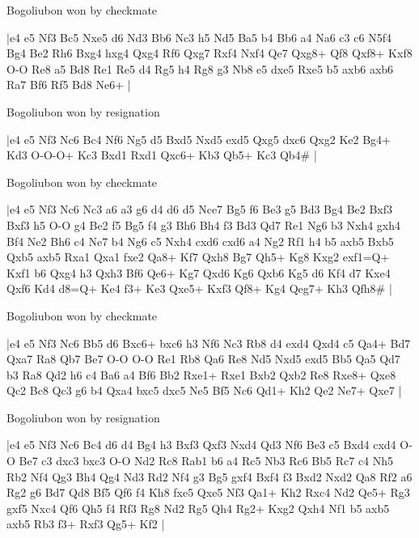 \showboard

Bogoliubon won by checkmate

\makegametitle
|e4 e5 Nf3 Bc5 Nxe5 d6 Nd3 Bb6 Nc3 h5 Nd5 Ba5 b4 Bb6 a4 Na6 c3 c6 N5f4 Bg4 Be2 Rh6 Bxg4 hxg4 Qxg4 Rf6 Qxg7 Rxf4 Nxf4 Qe7 Qxg8+ Qf8 Qxf8+ Kxf8 O-O Re8 a5 Bd8 Re1 Re5 d4 Rg5 h4 Rg8 g3 Nb8 e5 dxe5 Rxe5 b5 axb6 axb6 Ra7 Bf6 Rf5 Bd8 Ne6+  |

\showboard

Bogoliubon won by resignation

\makegametitle
|e4 e5 Nf3 Nc6 Bc4 Nf6 Ng5 d5 Bxd5 Nxd5 exd5 Qxg5 dxc6 Qxg2 Ke2 Bg4+ Kd3 O-O-O+ Kc3 Bxd1 Rxd1 Qxc6+ Kb3 Qb5+ Kc3 Qb4\#  |

\showboard

Bogoliubon won by checkmate

\makegametitle
|e4 e5 Nf3 Nc6 Nc3 a6 a3 g6 d4 d6 d5 Nce7 Bg5 f6 Be3 g5 Bd3 Bg4 Be2 Bxf3 Bxf3 h5 O-O g4 Be2 f5 Bg5 f4 g3 Bh6 Bh4 f3 Bd3 Qd7 Re1 Ng6 b3 Nxh4 gxh4 Bf4 Ne2 Bh6 c4 Ne7 b4 Ng6 c5 Nxh4 cxd6 cxd6 a4 Ng2 Rf1 h4 b5 axb5 Bxb5 Qxb5 axb5 Rxa1 Qxa1 fxe2 Qa8+ Kf7 Qxh8 Bg7 Qh5+ Kg8 Kxg2 exf1=Q+ Kxf1 b6 Qxg4 h3 Qxh3 Bf6 Qe6+ Kg7 Qxd6 Kg6 Qxb6 Kg5 d6 Kf4 d7 Kxe4 Qxf6 Kd4 d8=Q+ Ke4 f3+ Ke3 Qxe5+ Kxf3 Qf8+ Kg4 Qeg7+ Kh3 Qfh8\#  |

\showboard

Bogoliubon won by checkmate

\makegametitle
|e4 e5 Nf3 Nc6 Bb5 d6 Bxc6+ bxc6 h3 Nf6 Nc3 Rb8 d4 exd4 Qxd4 c5 Qa4+ Bd7 Qxa7 Ra8 Qb7 Be7 O-O O-O Re1 Rb8 Qa6 Re8 Nd5 Nxd5 exd5 Bb5 Qa5 Qd7 b3 Ra8 Qd2 h6 c4 Ba6 a4 Bf6 Bb2 Rxe1+ Rxe1 Bxb2 Qxb2 Re8 Rxe8+ Qxe8 Qc2 Bc8 Qc3 g6 b4 Qxa4 bxc5 dxc5 Ne5 Bf5 Nc6 Qd1+ Kh2 Qe2 Ne7+ Qxe7  |

\showboard

Bogoliubon won by resignation

\makegametitle
|e4 e5 Nf3 Nc6 Bc4 d6 d4 Bg4 h3 Bxf3 Qxf3 Nxd4 Qd3 Nf6 Be3 c5 Bxd4 cxd4 O-O Be7 c3 dxc3 bxc3 O-O Nd2 Rc8 Rab1 b6 a4 Rc5 Nb3 Rc6 Bb5 Rc7 c4 Nh5 Rb2 Nf4 Qg3 Bh4 Qg4 Nd3 Rd2 Nf4 g3 Bg5 gxf4 Bxf4 f3 Bxd2 Nxd2 Qa8 Rf2 a6 Rg2 g6 Bd7 Qd8 Bf5 Qf6 f4 Kh8 fxe5 Qxe5 Nf3 Qa1+ Kh2 Rxc4 Nd2 Qe5+ Rg3 gxf5 Nxc4 Qf6 Qh5 f4 Rf3 Rg8 Nd2 Rg5 Qh4 Rg2+ Kxg2 Qxh4 Nf1 b5 axb5 axb5 Rb3 f3+ Rxf3 Qg5+ Kf2  |

